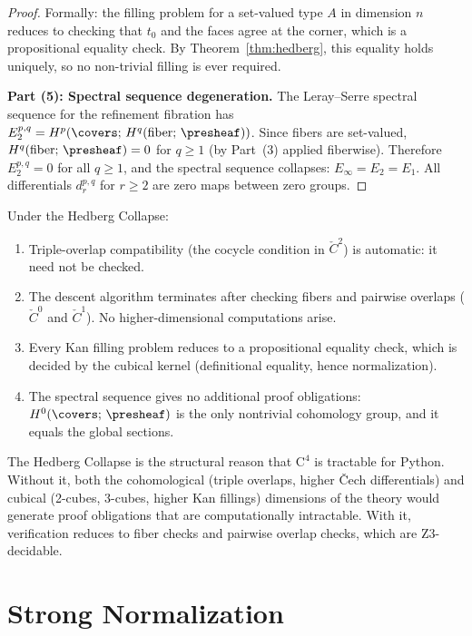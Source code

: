 \begin{proof}
Formally: the filling problem for a set-valued type $A$ in dimension
$n$ reduces to checking that $t_0$ and the faces agree at the
corner, which is a propositional equality check.  By
Theorem~\ref{thm:hedberg}, this equality holds uniquely, so no
non-trivial filling is ever required.

\textbf{Part (5): Spectral sequence degeneration.}
The Leray--Serre spectral sequence for the refinement fibration has
$E_2^{p,q} = H^p(\covers;\, H^q(\text{fiber};\, \presheaf))$.
Since fibers are set-valued, $H^q(\text{fiber};\, \presheaf) = 0$
for $q \geq 1$ (by Part~(3) applied fiberwise).  Therefore
$E_2^{p,q} = 0$ for all $q \geq 1$, and the spectral sequence collapses:
$E_\infty = E_2 = E_1$.  All differentials $d_r^{p,q}$ for $r \geq 2$
are zero maps between zero groups.
\end{proof}

\begin{corollary}
\label{cor:organizational-principle}
Under the Hedberg Collapse:
\begin{enumerate}
\item Triple-overlap compatibility (the cocycle condition in $\check{C}^2$)
  is automatic: it need not be checked.
\item The descent algorithm terminates after checking fibers and pairwise
  overlaps ($\check{C}^0$ and $\check{C}^1$).  No higher-dimensional
  computations arise.
\item Every Kan filling problem reduces to a propositional equality check,
  which is decided by the cubical kernel (definitional equality, hence
  normalization).
\item The spectral sequence gives no additional proof obligations:
  $H^0(\covers;\, \presheaf)$ is the only nontrivial cohomology group,
  and it equals the global sections.
\end{enumerate}
\end{corollary}

The Hedberg Collapse is the structural reason that $\mathrm{C}^4$ is
tractable for Python.  Without it, both the cohomological (triple overlaps,
higher \v{C}ech differentials) and cubical (2-cubes, 3-cubes, higher Kan
fillings) dimensions of the theory would generate proof obligations that are
computationally intractable.  With it, verification reduces to fiber checks
and pairwise overlap checks, which are Z3-decidable.


\section{Strong Normalization}
\label{sec:normalization}

